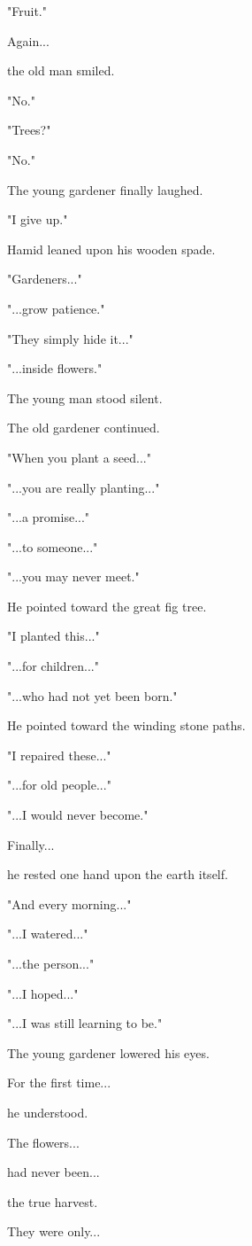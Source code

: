 \documentclass[12pt,openany]{book}
\begin{document}
"Fruit."

Again...

the old man smiled.

"No."

"Trees?"

"No."

The young gardener finally laughed.

"I give up."

Hamid leaned upon his wooden spade.

"Gardeners..."

"...grow patience."

"They simply hide it..."

"...inside flowers."

The young man stood silent.

The old gardener continued.

"When you plant a seed..."

"...you are really planting..."

"...a promise..."

"...to someone..."

"...you may never meet."

He pointed toward the great fig tree.

"I planted this..."

"...for children..."

"...who had not yet been born."

He pointed toward the winding stone paths.

"I repaired these..."

"...for old people..."

"...I would never become."

Finally...

he rested one hand upon the earth itself.

"And every morning..."

"...I watered..."

"...the person..."

"...I hoped..."

"...I was still learning to be."

The young gardener lowered his eyes.

For the first time...

he understood.

The flowers...

had never been...

the true harvest.

They were only...
\end{document}
